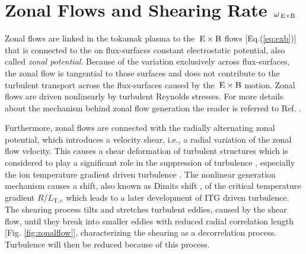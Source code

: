 \section{Zonal Flows and Shearing Rate $\omega_{\mathrm{\:E \times B}}$}
\label{sec:zonalflow}

Zonal flows are linked in the tokamak plasma to the $\mathrm{\:E}\times\mathrm{B}$ flows [Eq.(\ref{eq:exb})] that is connected to the on flux-surfaces constant electrostatic potential, also called \textit{zonal potential}. \cite{Diamond2005} Because of the variation exclusively across flux-surfaces, the zonal flow is tangential to those surfaces and does not contribute to the turbulent transport across the flux-surfaces caused by the $\mathrm{\:E}\times\mathrm{B}$ motion. 
Zonal flows are driven nonlinearly by turbulent Reynolds stresses. \cite{Diamond1991} For more details about the mechanism behind zonal flow generation the reader is referred to Ref. . \bigskip


Furthermore, zonal flows are connected with the radially alternating zonal potential, which introduces a velocity shear, i.e., a radial variation of the zonal flow velocity. This causes a shear deformation of turbulent structures which is considered to play a significant role in the suppression of turbulence \cite{Biglari1990, Dimits2000}, especially the ion temperature gradient driven turbulence \cite{Nakata2012, Makwana2014, Maeyama2014, Whelan2018, Whelan2019}. The nonlinear generation mechanism causes a shift, also known as Dimits shift \cite{Dimits2000}, of the critical temperature gradient $R/L_\mathrm{T,c}$ which leads to a later development of ITG driven turbulence. The shearing process tilts and stretches turbulent eddies, caused by the shear flow, until they break into smaller eddies with reduced radial correlation length [Fig. \ref{fig:zonalflow}],  characterizing the shearing as a decorrelation process. Turbulence will then be reduced because of this process. \cite{Biglari1990,Diamond2005,Burnell1997} \bigskip

\newpage

